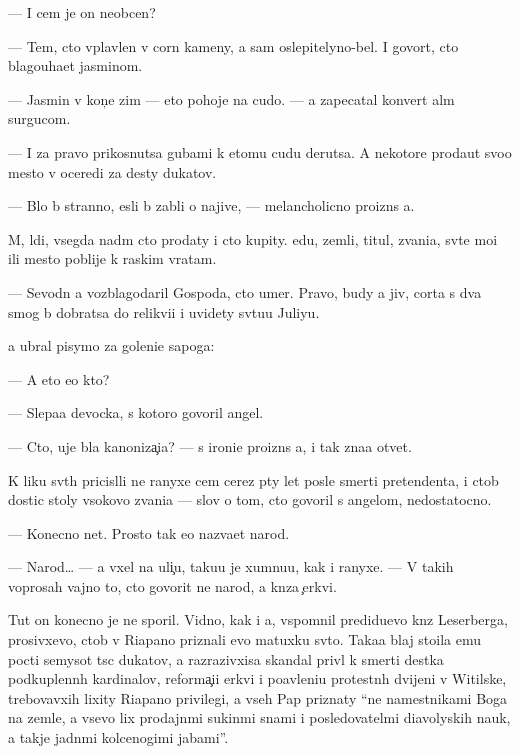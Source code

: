 \documentclass[10pt]{book}
\begin{document}
— I cem je on neob{\yi}cen?

— Tem, cto vplavlen v corn{\yi}{\y} kameny, a sam oslepitelyno-bel. I govor{\ia}t, cto blagouha{\y}et jasminom.

— Jasmin v kon{\c}e zim{\yi} — eto pohoje na cudo. — {\Y}a zapecatal konvert al{\yi}m surgucom.

— I za pravo prikosnutsa gubami k etomu cudu derutsa. A nekotor{\yi}{\y}e proda{\y}ut svo{\y}o mesto v oceredi za des{\ia}ty dukatov.

— B{\yi}lo b{\yi} stranno, {\y}esli b{\yi} zab{\yi}li o najive, — melancholicno proizn{\e}s {\y}a.

M{\yi}, l{\io}di, vsegda na{\y}d{\e}m cto prodaty i cto kupity. {\Y}edu, zemli, titul{\yi}, zvani{\y}a, sv{\ia}t{\yi}{\y}e mo{\x}i ili mesto poblije k ra{\y}skim vratam.

— Sevodn{\ia} {\y}a vozblagodaril Gospoda, cto umer. Pravo, budy {\y}a jiv, corta s dva smog b{\yi} dobratsa do relikvi{\y}i i uvidety sv{\ia}tu{\y}u Juliyu.

{\Y}a ubral pisymo za goleni{\x}e sapoga:

— A eto {\y}e{\x}o kto?

— Slepa{\y}a devocka, s kotoro{\y} govoril angel.

— Cto, uje b{\yi}la kanoniza{\c}i{\y}a? — s ironi{\y}e{\y} proizn{\e}s {\y}a, i tak zna{\y}a otvet.

K liku sv{\ia}t{\yi}h pricisl{\ia}li ne ranyxe cem cerez p{\ia}ty let posle smerti pretendenta, i ctob{\yi} dostic stoly v{\yi}\-so\-ko\-vo zvani{\y}a — slov o tom, cto govoril s angelom, nedostatocno.

— Konecno net. Prosto tak {\y}e{\y}o naz{\yi}va{\y}et narod.

— Narod… — {\Y}a v{\yi}xel na uli{\c}u, taku{\y}u je xumnu{\y}u, kak i ranyxe. — V takih voprosah vajno to, cto govorit ne narod, a kn{\ia}z{\y}a {\c}erkvi.

Tut on konecno je ne sporil. Vidno, kak i {\y}a, vspomnil predidu{\x}evo kn{\ia}z{\ia} Leserberga, prosivxevo, ctob{\yi} v Riapano priznali {\y}evo matuxku sv{\ia}to{\y}. Taka{\y}a blaj stoila {\y}emu pocti semysot t{\yi}s{\ia}c dukatov, a razrazivxi{\y}sa skandal priv{\e}l k smerti des{\ia}tka podkuplenn{\yi}h kardinalov, reforma{\c}i{\y}i {\C}erkvi i po{\y}avleni{\y}u protestn{\yi}h dvijeni{\y} v Witilske, trebovavxih lixity Riapano privilegi{\y}, a vseh Pap priznaty ``ne namestnikami Boga na zemle, a vsevo lix prodajn{\yi}mi sukin{\yi}mi s{\yi}nami i posledovatel{\ia}mi diavoly\-skih nauk, a takje jadn{\yi}mi kolcenogimi jabami''.
\end{document}
